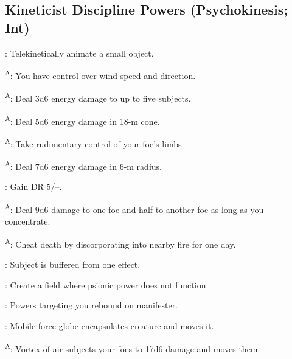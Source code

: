 \subsection{Kineticist Discipline Powers {\normalsize(Psychokinesis; Int)}}
\begin{enumerate*}
\item {}: Telekinetically animate a small object.
\item {}\textsuperscript{A}: You have control over wind speed and direction.

\textsuperscript{A}: Deal 3d6 energy damage to up to five subjects.

\item {}\textsuperscript{A}: Deal 5d6 energy damage in 18-m cone.
\item {}\textsuperscript{A}: Take rudimentary control of your foe's limbs.

\textsuperscript{A}: Deal 7d6 energy damage in 6-m radius.

: Gain DR 5/--.

\item {}\textsuperscript{A}: Deal 9d6 damage to one foe and half to another foe as long as you concentrate.

\textsuperscript{A}: Cheat death by discorporating into nearby fire for one day.

\item {}: Subject is buffered from one  effect.

: Create a field where psionic power does not function.

\item {}: Powers targeting you rebound on manifester.
\item {}: Mobile force globe encapsulates creature and moves it.
\item {}\textsuperscript{A}: Vortex of air subjects your foes to 17d6 damage and moves them.
\end{enumerate*}




